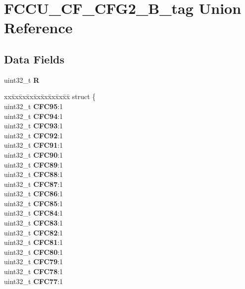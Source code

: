 \hypertarget{unionFCCU__CF__CFG2__32B__tag}{}\section{F\+C\+C\+U\+\_\+\+C\+F\+\_\+\+C\+F\+G2\+\_\+B\+\_\+tag Union Reference}
\label{unionFCCU__CF__CFG2__32B__tag}
\subsection*{Data Fields}
\begin{DoxyCompactItemize}
\item 
\mbox{\label{unionFCCU__CF__CFG2__32B__tag_a49d61310bf51b5fba550f7440d713ab1}} 
uint32\+\_\+t {\bfseries R}
\item 
\mbox{\label{unionFCCU__CF__CFG2__32B__tag_a825a4853389346c868e45a44b98b8fd9}} 
\begin{tabbing}
xx\=xx\=xx\=xx\=xx\=xx\=xx\=xx\=xx\=\kill
struct \{\\
\>uint32\_t {\bfseries CFC95}:1\\
\>uint32\_t {\bfseries CFC94}:1\\
\>uint32\_t {\bfseries CFC93}:1\\
\>uint32\_t {\bfseries CFC92}:1\\
\>uint32\_t {\bfseries CFC91}:1\\
\>uint32\_t {\bfseries CFC90}:1\\
\>uint32\_t {\bfseries CFC89}:1\\
\>uint32\_t {\bfseries CFC88}:1\\
\>uint32\_t {\bfseries CFC87}:1\\
\>uint32\_t {\bfseries CFC86}:1\\
\>uint32\_t {\bfseries CFC85}:1\\
\>uint32\_t {\bfseries CFC84}:1\\
\>uint32\_t {\bfseries CFC83}:1\\
\>uint32\_t {\bfseries CFC82}:1\\
\>uint32\_t {\bfseries CFC81}:1\\
\>uint32\_t {\bfseries CFC80}:1\\
\>uint32\_t {\bfseries CFC79}:1\\
\>uint32\_t {\bfseries CFC78}:1\\
\>uint32\_t {\bfseries CFC77}:1\\

\end{tabbing}
\end{DoxyCompactItemize}
